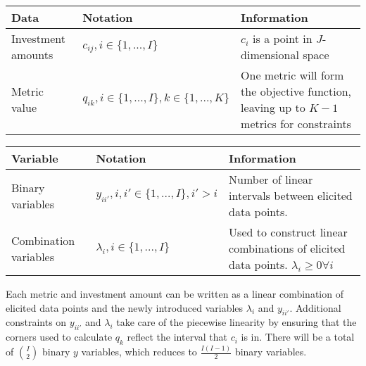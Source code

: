 \documentclass[letterpaper,10pt,english]{sphinxmanual}
\begin{document}
\begin{savenotes}\sphinxattablestart
\centering
{}
\sphinxthecaptionisattop
{}\label{\detokenize{doc-src/optimizers:table-2}}\label{\detokenize{doc-src/optimizers:tbl-milpdat}}
\sphinxaftertopcaption
\begin{tabulary}{\linewidth}[t]{|T|T|T|}
\hline
\sphinxstyletheadfamily 
Data
&\sphinxstyletheadfamily 
Notation
&\sphinxstyletheadfamily 
Information
\\
\hline
Investment amounts
&
\(c_{ij}, i \in \{1, ..., I\}\)
&
\(c_i\) is a point in \(J\)-dimensional space
\\
\hline
Metric value
&
\(q_{ik}, i \in \{1, ..., I \}, k \in \{1, ..., K \}\)
&
One metric will form the objective function, leaving up to \(K-1\) metrics for constraints
\\
\hline
\end{tabulary}
\par
\sphinxattableend\end{savenotes}


\begin{savenotes}\sphinxattablestart
\centering
{}
\sphinxthecaptionisattop
{}\label{\detokenize{doc-src/optimizers:table-3}}\label{\detokenize{doc-src/optimizers:tbl-milpvar}}
\sphinxaftertopcaption
\begin{tabulary}{\linewidth}[t]{|T|T|T|}
\hline
\sphinxstyletheadfamily 
Variable
&\sphinxstyletheadfamily 
Notation
&\sphinxstyletheadfamily 
Information
\\
\hline
Binary variables
&
\(y_{ii'}, i, i' \in \{1, ..., I\}, i' > i\)
&
Number of linear intervals between elicited data points.
\\
\hline
Combination variables
&
\(\lambda_{i}, i \in \{1, ..., I\}\)
&
Used to construct linear combinations of elicited data points. \(\lambda_{i} \geq 0 \forall i\)
\\
\hline
\end{tabulary}
\par
\sphinxattableend\end{savenotes}

Each metric and investment amount can be written as a linear combination of elicited data points and the newly introduced variables \(\lambda_{i}\) and \(y_{ii'}\). Additional constraints on \(y_{ii'}\) and \(\lambda_{i}\) take care of the piecewise linearity by ensuring that the corners used to calculate \(q_k\) reflect the interval that \(c_i\) is in. There will be a total of \(\binom{I}{2}\) binary \(y\) variables, which reduces to \(\frac{I(I-1)}{2}\) binary variables.
\end{document}
